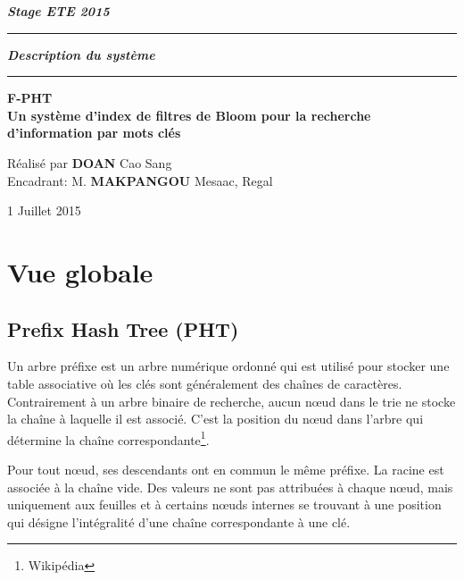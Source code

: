 \documentclass[a4paper,11pt]{report}
\begin{document}
	\begin{titlepage}
		\begin{center}
			\large\bfseries\itshape Stage ETE 2015\\
		\end{center}
		\noindent\rule{\linewidth}{3pt}

		\begin{center}
			\Huge\bfseries\itshape Description du système\\
		\end{center}
		
		\noindent\rule{\linewidth}{3pt}
		\begin{center}
			\bfseries
			\large F-PHT \\
			\large Un système d'index de filtres de Bloom pour la recherche d'information par mots clés
		\end{center}
		\begin{center}
			Réalisé par \textbf{DOAN} Cao Sang \\
			Encadrant: M. \textbf{MAKPANGOU} Mesaac, Regal
		\end{center}
		\begin{center}
			1 Juillet 2015
		\end{center}
	\end{titlepage}

\tableofcontents

\chapter{Vue globale}
\section{Prefix Hash Tree (PHT)}
	Un arbre préfixe est un arbre numérique ordonné qui est utilisé pour stocker une table associative où les clés sont généralement des chaînes de caractères. Contrairement à un arbre binaire de recherche, aucun nœud dans le trie ne stocke la chaîne à laquelle il est associé. C'est la position du nœud dans l'arbre qui détermine la chaîne correspondante\footnote{Wikipédia}.
	
	Pour tout nœud, ses descendants ont en commun le même préfixe. La racine est associée à la chaîne vide. Des valeurs ne sont pas attribuées à chaque nœud, mais uniquement aux feuilles et à certains nœuds internes se trouvant à une position qui désigne l'intégralité d'une chaîne correspondante à une clé.
	
\end{document}

